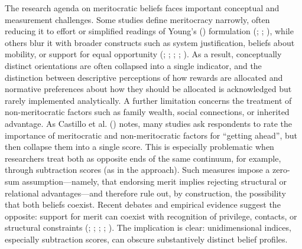 \documentclass[
  13pt,
]{article}
\begin{document}
The research agenda on meritocratic beliefs faces important conceptual
and measurement challenges. Some studies define meritocracy narrowly,
often reducing it to effort or simplified readings of Young's
() formulation
(;
;
), while
others blur it with broader constructs such as system justification,
beliefs about mobility, or support for equal opportunity
(;
;
;
;
). As a result,
conceptually distinct orientations are often collapsed into a single
indicator, and the distinction between descriptive perceptions of how
rewards are allocated and normative preferences about how they should be
allocated is acknowledged but rarely implemented analytically. A further
limitation concerns the treatment of non-meritocratic factors such as
family wealth, social connections, or inherited advantage. As Castillo
et al. () notes, many
studies ask respondents to rate the importance of meritocratic and
non-meritocratic factors for ``getting ahead'', but then collapse them
into a single score. This is especially problematic when researchers
treat both as opposite ends of the same continuum, for example, through
subtraction scores (as in the
approach). Such measures impose a zero-sum assumption---namely, that
endorsing merit implies rejecting structural or relational
advantages---and therefore rule out, by construction, the possibility
that both beliefs coexist. Recent debates and empirical evidence suggest
the opposite: support for merit can coexist with recognition of
privilege, contacts, or structural constraints
(;
;
;
;
). The implication is
clear: unidimensional indices, especially subtraction scores, can
obscure substantively distinct belief profiles.
\end{document}
